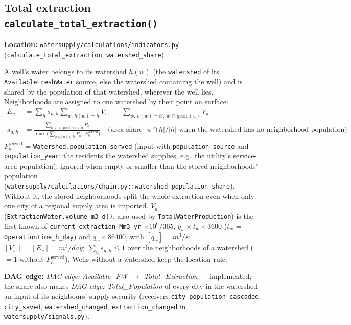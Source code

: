 \documentclass[11pt]{article}
\newcommand{\code}[1]{\texttt{#1}}
\newcommand{\dagedge}[1]{\textit{DAG edge: #1}}
\newcommand{\statusdone}{\textcolor{green!50!black}{implemented}}
\begin{document}
\subsection{Total extraction --- \code{calculate\_total\_extraction()}}
\textbf{Location:} \code{watersupply/calculations/indicators.py} (\code{calculate\_total\_extraction}, \code{watershed\_share})

A well's water belongs to its watershed $h(w)$ (the \code{watershed} of its \code{AvailableFreshWater} source, else the watershed containing the well) and is shared by the population of that watershed, wherever the well lies. Neighborhoods are assigned to one watershed by their point on surface:
\begin{align}
  E_u &= \sum_{h} s_{u,h} \sum_{w:\,h(w)=h} V_w \;+\; \sum_{w:\,h(w)=\varnothing,\ w \,\cap\, \text{geom}(u)} V_w \\
  s_{u,h} &= \frac{\sum_{n \,\in\, u,\ \text{pos}(n) \in h} P_n}{\max\!\big(\sum_{\text{pos}(n) \in h} P_n,\ P^{\text{served}}_h\big)}
  \quad\text{(area share } |u \cap h| / |h| \text{ when the watershed has no neighborhood population)}
\end{align}
$P^{\text{served}}_h$ = \texttt{Watershed.population\_served} (input with \texttt{population\_source} and \texttt{population\_year}: the residents the watershed supplies, e.g.\ the utility's service-area population), ignored when empty or smaller than the stored neighborhoods' population (\code{watersupply/calculations/chain.py::watershed\_population\_share}). Without it, the stored neighborhoods split the whole extraction even when only one city of a regional supply area is imported.
$V_w$ (\code{ExtractionWater.volume\_m3\_d()}, also used by \code{TotalWaterProduction}) is the first known of \texttt{current\_extraction\_Mm3\_yr} $\times 10^6 / 365$, $q_w \times t_w \times 3600$ ($t_w$ = \texttt{OperationTime\_h\_day}) and $q_w \times 86400$, with $[q_w] = \si{m^3/s}$; $[V_w] = [E_u] = \si{m^3/day}$; $\sum_u s_{u,h} \le 1$ over the neighborhoods of a watershed ($= 1$ without $P^{\text{served}}_h$). Wells without a watershed keep the location rule.

\textbf{DAG edge:} \dagedge{Available\_FW $\rightarrow$ Total\_Extraction} --- \statusdone{}; the share also makes \dagedge{Total\_Population} of every city in the watershed an input of its neighbours' supply security (receivers \code{city\_population\_cascaded}, \code{city\_saved}, \code{watershed\_changed}, \code{extraction\_changed} in \code{watersupply/signals.py}).
\end{document}
